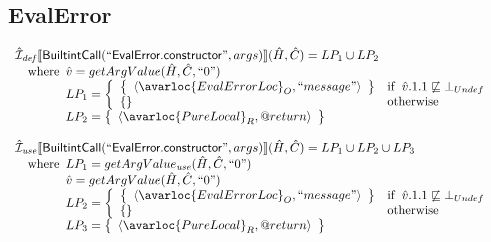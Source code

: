 \subsection{EvalError}
\[
\begin{array}{l}

\aI_{\it def}\lbr \SF{BuiltintCall}(``\SF{EvalError.constructor}",args)\rbr(\hat{H},\hat{C})
  = LP_1 \cup LP_2\\
\quad\wherec{
  \hat{v} = getArgValue(\hat{H}, \hat{C}, ``0")\\
  LP_1 = \left\{\begin{array}{ll}
  \set{\langle\avarloc{EvalErrorLoc}_O, ``message"\rangle} & \ifc{\hat{v}.1.1 \not\sqsubseteq \bot_{Undef}}\\
  \set{} & \owc\\
    \end{array}\right.\\
  LP_2 = \set{\langle\avarloc{PureLocal}_R,\varprop{return}\rangle}\\
  }\\
\\


\aI_{\it use}\lbr \SF{BuiltintCall}(``\SF{EvalError.constructor}",args)\rbr(\hat{H},\hat{C})
  = LP_1 \cup LP_2 \cup LP_3\\
\quad\wherec{
  LP_1 = getArgValue_{\it use}(\hat{H}, \hat{C}, ``0")\\
  \hat{v} = getArgValue(\hat{H}, \hat{C}, ``0")\\
  LP_2 = \left\{\begin{array}{ll}
  \set{\langle\avarloc{EvalErrorLoc}_O, ``message"\rangle} & \ifc{\hat{v}.1.1 \not\sqsubseteq \bot_{Undef}}\\
  \set{} & \owc\\
    \end{array}\right.\\
  LP_3 = \set{\langle\avarloc{PureLocal}_R,\varprop{return}\rangle}\\
  }\\
\\

\end{array}
\]



